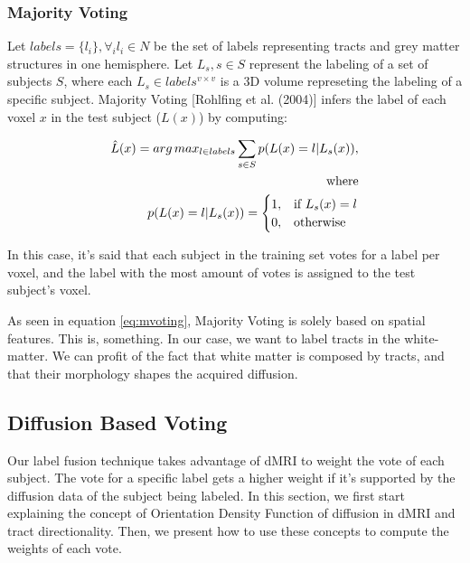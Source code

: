 \subsubsection{Majority Voting}
Let $labels = \{l_i\}, \forall_i l_i \in N$ be the set of labels representing
tracts and grey matter structures in one hemisphere. Let ${L_s}, s \in S$
represent the labeling of a set of subjects $S$, where each 
$L_s \in labels^{v\times v}$ is a 3D volume represeting the labeling of a
specific subject. Majority Voting [Rohlfing et al. (2004)] infers the label of
each voxel $x$ in the test subject ($L(x)$) by computing:

\begin{equation}
\label{eq:mvoting}
\begin{aligned}
    \hat L(x) = arg\,max_{l \in labels} \sum_{s\in S} p(L(x) = l | L_s(x)),\\
    \text{where} \\
    p(L(x) = l | L_s(x)) =
    \begin{cases}
        1,& \text{if } L_s(x) = l \\
        0,& \text{otherwise}
    \end{cases}
\end{aligned}
\end{equation}

In this case, it's said that each subject in the training set votes for a label
per voxel, and the label with the most amount of votes is assigned to the test
subject's voxel.

As seen in equation \ref{eq:mvoting}, Majority Voting is solely based on
spatial features. This is, something. In our case, we want to label tracts
in the white-matter. We can profit of the fact that white matter is composed
by tracts, and that their morphology shapes the acquired diffusion.

\subsection{Diffusion Based Voting}

Our label fusion technique takes advantage of dMRI to weight the vote of each
subject. The vote for a specific label gets a higher weight if it's supported
by the diffusion data of the subject being labeled. In this section, we first
start explaining the concept of Orientation Density Function of diffusion in
dMRI and tract directionality. Then, we present how to use these concepts to
compute the weights of each vote.

